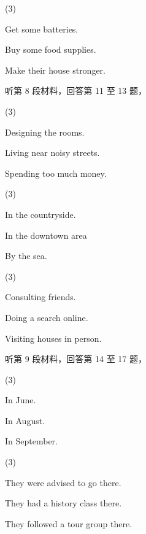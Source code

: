 \documentclass{英语试卷}
\begin{document}
\begin{choices}(3)
  \item Get some batteries.
  \item Buy some food supplies.
  \item Make their house stronger.
\end{choices}
\par 听第 8 段材料，回答第 11 至 13 题，\par
{}
\begin{choices}(3)
  \item Designing the rooms.
  \item Living near noisy streets.
  \item Spending too much money.
\end{choices}
\begin{choices}(3)
  \item In the countryside.
  \item In the downtown area
  \item By the sea.
\end{choices}
\begin{choices}(3)
  \item Consulting friends.
  \item Doing a search online.
  \item Visiting houses in person.
\end{choices}
\par 听第 9 段材料，回答第 14 至 17 题，\par
{}
\begin{choices}(3)
  \item In June.
  \item In August.
  \item In September.
\end{choices}
\begin{choices}(3)
  \item They were advised to go there.
  \item They had a history class there.
  \item They followed a tour group there.
\end{choices}
\end{document}
